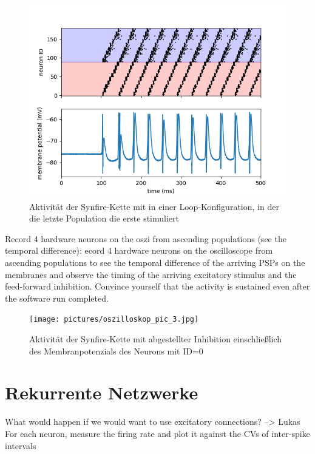 \documentclass[10pt,a4paper]{scrartcl}
\begin{document}
\begin{figure} [ht]
\begin{center}
\label{fig:abb4}
\caption{Aktivität der Synfire-Kette mit in einer Loop-Konfiguration, in der die letzte Population die erste stimuliert}
\includegraphics[scale=0.35]{pictures/synfire_chain_loop.png}
\end{center}
\end{figure}

Record 4 hardware neurons on the oszi from ascending populations (see the temporal difference):
ecord 4 hardware neurons on the oscilloscope from ascending populations to see the
temporal difference of the arriving PSPs on the membranes and observe the timing of
the arriving excitatory stimulus and the feed-forward inhibition. Convince yourself that
the activity is sustained even after the software run completed.


\begin{figure} [ht]
\begin{center}
\label{fig:abb4}
\caption{Aktivität der Synfire-Kette mit abgestellter Inhibition einschließlich des Membranpotenzials des Neurons mit ID=0}
\texttt{[image: pictures/oszilloskop\_pic\_3.jpg]}
\end{center}
\end{figure}

\newpage


\section{Rekurrente Netzwerke}
What would happen if we would want to use excitatory connections? --> Lukas
For each neuron, measure the firing rate and plot it against the
CVs of inter-spike intervals
\end{document}
